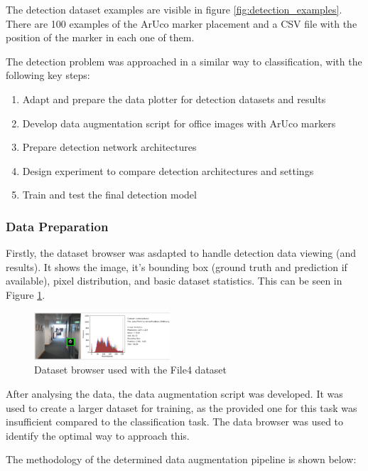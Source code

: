 \documentclass[conference]{IEEEtran}
\begin{document}
The detection dataset examples are visible in figure \ref{fig:detection_examples}.
There are 100 examples of the ArUco marker placement and a CSV file with the position of the marker in each one of them.

The detection problem was approached in a similar way to classification, with the following key steps:

\begin{enumerate}
  \item Adapt and prepare the data plotter for detection datasets and results
  \item Develop data augmentation script for office images with ArUco markers
  \item Prepare detection network architectures
  \item Design experiment to compare detection architectures and settings
  \item Train and test the final detection model
\end{enumerate}

\subsubsection{Data Preparation}

Firstly, the dataset browser was asdapted to handle detection data viewing (and results).
It shows the image, it's bounding box (ground truth and prediction if available), pixel distribution, and basic dataset statistics.
This can be seen in Figure \ref{fig:data_browser_2}.

\begin{figure}[h]
  \centering
  \includegraphics[width=0.45\textwidth]{images/aruco-dataset-browser-2.png}
  \caption{Dataset browser used with the File4 dataset}
  \label{fig:data_browser_2}
\end{figure}

After analysing the data, the data augmentation script was developed. It was used to create a larger dataset for training, as the provided one
for this task was insufficient compared to the classification task. The data browser was used to identify the optimal way to approach this.

The methodology of the determined data augmentation pipeline is shown below:
\end{document}
